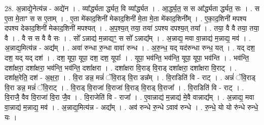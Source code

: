 \documentclass[17pt]{extarticle}
\begin{document}
28. अ॒न्नाद्ये॒नेत्य॑न्न - अद्ये॑न । . व्या᳚र्द्ध्यता र्द्ध्यत॒ वि व्या᳚र्द्ध्यत । . आ॒र्द्ध्य॒त॒ स स आ᳚र्द्ध्यता र्द्ध्यत॒ सः । . स ए॒ता मे॒ताꣳ स स ए॒ताम् । . ए॒ता मे॑काद॒शिनी॑ मेकाद॒शिनी॑ मे॒ता मे॒ता मे॑काद॒शिनी᳚म् । . ए॒का॒द॒शिनी॑ मपश्य दपश्य देकाद॒शिनी॑ मेकाद॒शिनी॑ मपश्यत् । . अ॒प॒श्य॒त् तया॒ तया॑ ऽपश्य दपश्य॒त् तया᳚ । . तया॒ वै वै तया॒ तया॒ वै । . वै स स वै वै सः । . सो᳚ ऽन्नाद्य॑ म॒न्नाद्यꣳ॒॒ स सो᳚ ऽन्नाद्य᳚म् । . अ॒न्नाद्य॒ मवा वा॒न्नाद्य॑ म॒न्नाद्य॒ मव॑ । . अ॒न्नाद्य॒मित्य॑न्न - अद्य᳚म् । . अवा॑ रुन्धा रु॒न्धा वावा॑ रुन्ध । . अ॒रु॒न्ध॒ यद् यद॑रुन्धा रुन्ध॒ यत् । . यद् दश॒ दश॒ यद् यद् दश॑ । . दश॒ यूपा॒ यूपा॒ दश॒ दश॒ यूपाः᳚ । . यूपा॒ भव॑न्ति॒ भव॑न्ति॒ यूपा॒ यूपा॒ भव॑न्ति । . भव॑न्ति॒ दशा᳚क्षरा॒ दशा᳚क्षरा॒ भव॑न्ति॒ भव॑न्ति॒ दशा᳚क्षरा । . दशा᳚क्षरा वि॒राड् वि॒राड् दशा᳚क्षरा॒ दशा᳚क्षरा वि॒राट् । . दशा᳚क्ष॒रेति॒ दश॑ - अ॒क्ष॒रा॒ । . वि॒रा डन्न॒ मन्नं॑ ॅवि॒राड् वि॒रा डन्न᳚म् । . वि॒राडिति॑ वि - राट् । . अन्नं॑ ॅवि॒राड् वि॒रा डन्न॒ मन्नं॑ ॅवि॒राट् । . वि॒राड् वि॒राजा॑ वि॒राजा॑ वि॒राड् वि॒राड् वि॒राजा᳚ । . वि॒राडिति॑ वि - राट् । . वि॒राजै॒ वैव वि॒राजा॑ वि॒रा जै॒व । . वि॒राजेति॑ वि - राजा᳚ । . ए॒वान्नाद्य॑ म॒न्नाद्य॑ मे॒वै वान्नाद्य᳚म् । . अ॒न्नाद्य॒ मवा वा॒न्नाद्य॑ म॒न्नाद्य॒ मव॑ । . अ॒न्नाद्य॒मित्य॑न्न - अद्य᳚म् । . अव॑ रुन्धे रु॒न्धे ऽवाव॑ रुन्धे । . रु॒न्धे॒ यो यो रु॑न्धे रुन्धे॒ यः । \newline
\end{document}
